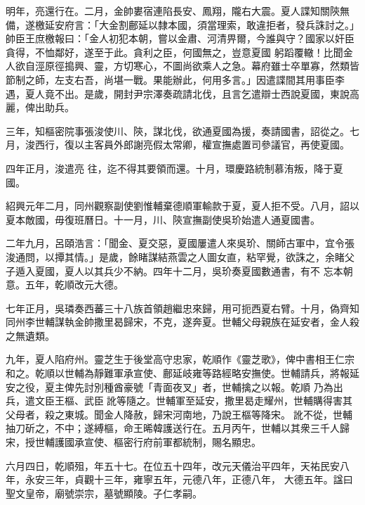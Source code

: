 \begin{pinyinscope}
 明年，亮還行在。二月，金帥婁宿連陷長安、鳳翔，隴右大震。夏人諜知關陝無備，遂檄延安府言：「大金割鄜延以隸本國，須當理索，敢違拒者，發兵誅討之。」帥臣王庶檄報曰：「金人初犯本朝，嘗以金肅、河清畀爾，今誰與守？國家以奸臣貪得，不恤鄰好，遂至于此。貪利之臣，何國無之，豈意夏國
 躬蹈覆轍！比聞金人欲自涇原徑搗興、靈，方切寒心，不圖尚欲乘人之急。幕府雖士卒單寡，然類皆節制之師，左支右吾，尚堪一戰。果能辦此，何用多言。」因遣諜間其用事臣李遇，夏人竟不出。是歲，開封尹宗澤奏疏請北伐，且言乞遣辯士西說夏國，東說高麗，俾出助兵。



 三年，知樞密院事張浚使川、陝，謀北伐，欲通夏國為援，奏請國書，詔從之。七月，浚西行，復以主客員外郎謝亮假太常卿，權宣撫處置司參議官，再使夏國。



 四年正月，浚遣亮
 往，迄不得其要領而還。十月，環慶路統制慕洧叛，降于夏國。



 紹興元年二月，同州觀察副使劉惟輔棄德順軍輸款于夏，夏人拒不受。八月，詔以夏本敵國，毋復班曆日。十一月，川、陝宣撫副使吳玠始遣人通夏國書。



 二年九月，呂頤浩言：「聞金、夏交惡，夏國屢遣人來吳玠、關師古軍中，宜令張浚通問，以撢其情。」是歲，餘睹謀結燕雲之人圖女直，粘罕覺，欲誅之，余睹父子遁入夏國，夏人以其兵少不納。四年十二月，吳玠奏夏國數通書，有不
 忘本朝意。五年，乾順改元大德。



 七年正月，吳璘奏西蕃三十八族首領趙繼忠來歸，用可扼西夏右臂。十月，偽齊知同州李世輔謀執金帥撒里曷歸宋，不克，遂奔夏。世輔父母親族在延安者，金人殺之無遺類。



 九年，夏人陷府州。靈芝生于後堂高守忠家，乾順作《靈芝歌》，俾中書相王仁宗和之。乾順以世輔為靜難軍承宣使、鄜延岐雍等路經略安撫使。世輔請兵，將報延安之役，夏主俾先討別種酋豪號「青面夜叉」者，世輔擒之以報。乾順
 乃為出兵，遣文臣王樞、武臣𠼪訛等隨之。世輔軍至延安，撒里曷走耀州，世輔購得害其父母者，殺之東城。聞金人降赦，歸宋河南地，乃說王樞等降宋。𠼪訛不從，世輔抽刀斫之，不中；遂縛樞，命王晞韓護送行在。五月丙午，世輔以其衆三千人歸宋，授世輔護國承宣使、樞密行府前軍都統制，賜名顯忠。



 六月四日，乾順殂，年五十七。在位五十四年，改元天儀治平四年，天祐民安八年，永安三年，貞觀十三年，雍寧五年，元德八年，正德八年，
 大德五年。諡曰聖文皇帝，廟號崇宗，墓號顯陵。子仁孝嗣。




\end{pinyinscope}
